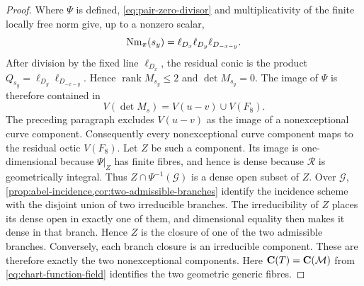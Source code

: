 \begin{proof}
Where $\Psi$ is defined, \eqref{eq:pair-zero-divisor} and multiplicativity
of the finite locally free norm give, up to a nonzero scalar,
\[
 \operatorname{Nm}_\pi(s_y)=\ell_{D_x}\ell_{D_y}\ell_{D_{-x-y}}.
\]
After division by the fixed line $\ell_{D_x}$, the residual conic is the
product $Q_{s_y}=\ell_{D_y}\ell_{D_{-x-y}}$.  Hence
$\operatorname{rank}M_{s_y}\le2$ and $\det M_{s_y}=0$.  The image of
$\Psi$ is therefore contained in
\[
 V(\det M_s)=V(u-v)\cup V(F_8).
\]
The preceding paragraph excludes $V(u-v)$ as the image of a
nonexceptional curve component.  Consequently every nonexceptional curve
component maps to the residual octic $V(F_8)$.  Let $Z$ be such a component.
Its image is one-dimensional because $\Psi|_Z$ has finite fibres, and hence
is dense because $\mathscr R$ is geometrically integral.  Thus
$Z\cap\Psi^{-1}(\mathscr G)$ is a dense open subset of $Z$.  Over
$\mathscr G$, \cref{prop:abel-incidence,cor:two-admissible-branches}
identify the incidence scheme with the disjoint union of two irreducible
branches.  The irreducibility of $Z$ places its dense open in exactly one of
them, and dimensional equality then makes it dense in that branch.  Hence
$Z$ is the closure of one of the two admissible branches.  Conversely, each
branch closure is an irreducible component.  These are therefore exactly the
two nonexceptional components.
Here $\mathbf C(T)=\mathbf C(\mathcal M)$ from \eqref{eq:chart-function-field} identifies the
two geometric generic fibres.
\end{proof}


